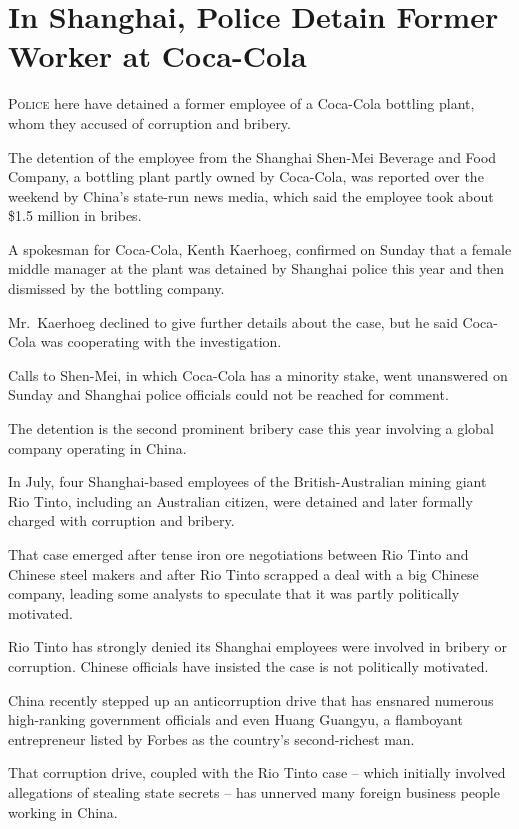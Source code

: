 ﻿\documentclass[12pt]{article}
\begin{document}
\section{In Shanghai, Police Detain Former Worker at Coca-Cola}

\lettrine{P}{olice} here have detained a former employee of a Coca-Cola bottling plant, whom they
accused of corruption and bribery\cite{bribery}.

The detention of the employee from the Shanghai Shen-Mei Beverage and Food Company, a bottling plant
partly owned by Coca-Cola, was reported over the weekend by China's state-run news media, which said
the employee took about \$1.5 million in bribes.

A spokesman for Coca-Cola, Kenth Kaerhoeg, confirmed on Sunday that a female middle manager at the
plant was detained by Shanghai police this year and then dismissed by the bottling company.

Mr.~Kaerhoeg declined to give further details about the case, but he said Coca-Cola was cooperating
with the investigation.

Calls to Shen-Mei, in which Coca-Cola has a minority stake, went unanswered on Sunday and Shanghai
police officials could not be reached for comment.

The detention is the second prominent bribery case this year involving a global company operating in
China.

In July, four Shanghai-based employees of the British-Australian mining giant Rio Tinto, including
an Australian citizen, were detained and later formally charged with corruption and bribery.

That case emerged after tense iron ore negotiations between Rio Tinto and Chinese steel makers and
after Rio Tinto scrapped a deal with a big Chinese company, leading some analysts to speculate that
it was partly politically motivated.

Rio Tinto has strongly denied its Shanghai employees were involved in bribery or corruption. Chinese
officials have insisted the case is not politically motivated.

China recently stepped up an anticorruption drive that has ensnared numerous high-ranking government
officials and even Huang Guangyu, a flamboyant entrepreneur listed by Forbes as the country's
second-richest man.

That corruption drive, coupled with the Rio Tinto case -- which initially involved allegations of
stealing state secrets -- has unnerved many foreign business people working in China.
\end{document}

